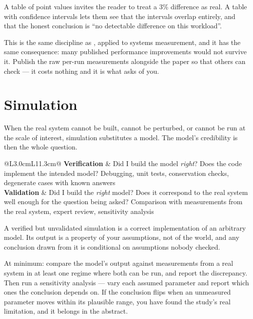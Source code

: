 \begin{conceptbox}
A table of point values invites the reader to treat a 3\% difference as real. A
table with confidence intervals lets them see that the intervals overlap
entirely, and that the honest conclusion is ``no detectable difference on this
workload''.

\medskip
This is the same discipline as , applied to systems
measurement, and it has the same consequence: many published performance
improvements would not survive it. Publish the raw per-run measurements
alongside the paper so that others can check --- it costs nothing and it is
what  asks of you.
\end{conceptbox}

\section{Simulation}

When the real system cannot be built, cannot be perturbed, or cannot be run at
the scale of interest, simulation substitutes a model. The model's credibility
is then the whole question.

\begin{center}
\small
\begin{tabular}{@{}L{3.0cm}L{11.3cm}@{}}
\toprule
\textbf{Verification} & Did I build the model \emph{right}? Does the code
                        implement the intended model? Debugging, unit tests,
                        conservation checks, degenerate cases with known
                        answers \\
\textbf{Validation}   & Did I build the \emph{right} model? Does it correspond
                        to the real system well enough for the question being
                        asked? Comparison with measurements from the real
                        system, expert review, sensitivity analysis \\
\bottomrule
\end{tabular}
\end{center}

\begin{alertbox}
A verified but unvalidated simulation is a correct implementation of an
arbitrary model. Its output is a property of your assumptions, not of the
world, and any conclusion drawn from it is conditional on assumptions nobody
checked.

\medskip
At minimum: compare the model's output against measurements from a real system
in at least one regime where both can be run, and report the discrepancy. Then
run a sensitivity analysis --- vary each assumed parameter and report which
ones the conclusion depends on. If the conclusion flips when an unmeasured
parameter moves within its plausible range, you have found the study's real
limitation, and it belongs in the abstract.
\end{alertbox}

